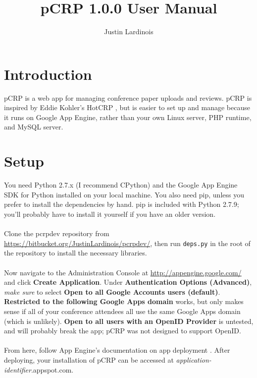 \documentclass[12pt]{article}
\title{pCRP 1.0.0 User Manual}
\author{Justin Lardinois}
\date{}
\begin{document}
\maketitle

\section{Introduction}
	pCRP is a web app for managing conference paper uploads and reviews.
	pCRP is inspired by Eddie Kohler's HotCRP \cite{kohler}, but is easier
	to set up and manage because it runs on Google App Engine, rather than
	your own Linux server, PHP runtime, and MySQL server.

\section{Setup}
	You need Python 2.7.x (I recommend CPython) and the Google App Engine
	SDK for Python \cite{gaesdk} installed on your local machine. You also
	need pip, unless you prefer to install the dependencies by hand. pip
	is included with Python 2.7.9; you'll probably have to install it
	yourself if you have an older version.
	\\\\
	Clone the pcrpdev repository from
	\url{https://bitbucket.org/JustinLardinois/pcrpdev/}, then run
	\texttt{deps.py} in the root of the repository to install the
	necessary libraries.
	\\\\
	Now navigate to the Administration Console at
	\url{http://appengine.google.com/} and click \textbf{Create Application}.
	Under \textbf{Authentication Options (Advanced)}, \textit{make sure}
	to select \textbf{Open to all Google Accounts users (default)}.
	\textbf{Restricted to the following Google Apps domain} works,
	but only makes sense if all of your conference attendees all use
	the same Google Apps domain (which is unlikely).
	\textbf{Open to all users with an OpenID Provider} is untested,
	and will probably break the app; pCRP was not designed to
	support OpenID.
	\\\\
	From here, follow App Engine's documentation on app deployment
	\cite{deploy}. After deploying, your installation of pCRP can
	be accessed at \textit{application-identifier}.appspot.com.
\end{document}
